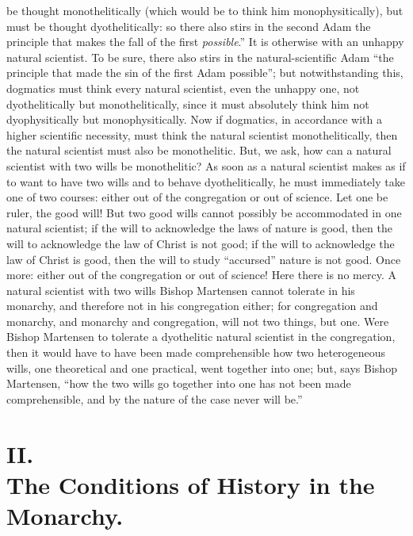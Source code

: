 \documentclass[12pt]{book}
\newcommand{\opage}[1]{\marginnote{\footnotesize\textit{[#1]}}}
\begin{document}
be thought monothelitically (which would be to think him monophysitically), but must be thought dyothelitically: so there also stirs in the second Adam the principle that makes the fall of the first \emph{possible}.'' It is otherwise with an unhappy natural scientist. To be sure, there also stirs in the natural-scientific Adam ``the principle that made the sin of the first Adam possible''; but notwithstanding this, dogmatics must think every natural scientist, even the unhappy one, not dyothelitically but monothelitically, since it must absolutely think him not dyophysitically but monophysitically. Now if dogmatics, in accordance with a higher scientific necessity, must think the natural scientist monothelitically, then the natural scientist must also be monothelitic. But, we ask, how can a natural scientist with two wills be monothelitic? As soon as a natural scientist makes as if to want to have two wills and to behave dyothelitically, he must immediately take one of two courses: either out of the congregation or out of science. Let one be ruler, the good will! But two good wills cannot possibly be accommodated in one natural scientist; if the will to acknowledge the laws of nature is good, then the will to acknowledge the law of Christ is not good; if the will to acknowledge the law of Christ is good, then the will to study ``accursed'' nature is not good. Once more: either out of the congregation or out of science! Here there is no mercy. A natural scientist with two wills Bishop Martensen cannot tolerate in his monarchy, and therefore not in his congregation either; for congregation and monarchy, and monarchy and congregation, will not two things, but one. Were Bishop Martensen to tolerate a dyothelitic natural scientist in the congregation, then it would have to have been made comprehensible how two heterogeneous wills, one theoretical and one practical, went together into one; but, says Bishop Martensen, ``how the two wills go together into one has not been made comprehensible, and by the nature of the case never will be.''

\opage{40}\setcounter{footnote}{0}%
\section*{II.\\ The Conditions of History in the Monarchy.}
\end{document}
